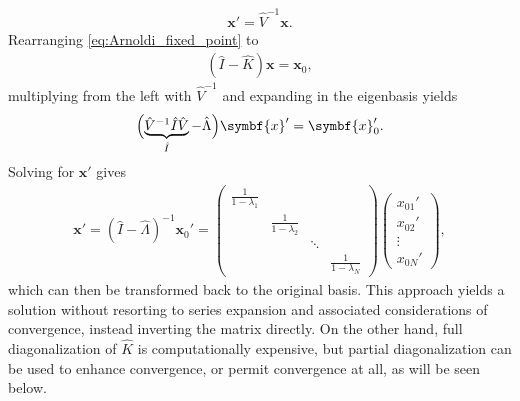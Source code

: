 \documentclass[a4paper, twoside, 10pt, english]{article}
\numberwithin{equation}{section}
\let\vec\symbf
\begin{document}
\begin{gather}
  \vec{x}' = \hat{V}^{-1} \vec{x}.
\end{gather}
Rearranging \cref{eq:Arnoldi_fixed_point} to
\begin{gather}
  \left ( \hat{I} - \hat{K} \right ) \vec{x} = \vec{x}_{0}, \label{eq:Arnoldi_direct}
\end{gather}
multiplying from the left with $\hat{V}^{-1}$ and expanding in the eigenbasis yields
\begin{gather}
  \Bigl ( \underbrace{\hat{V}^{-1} \hat{I} \hat{V}}_{\hat{I}} - \hat{\Lambda} \Bigr ) \vec{x}' = \vec{x}_{0}'.
\end{gather}
Solving for $\vec{x}'$ gives
\begin{gather}
  \vec{x}' = \left ( \hat{I} - \hat{\Lambda} \right )^{-1} \vec{x}_{0}' = \begin{pmatrix}
    \frac{1}{1 - \lambda_{1}} & & & \\
    & \frac{1}{1 - \lambda_{2}} & & \\
    & & \ddots & \\
    & & & \frac{1}{1 - \lambda_{N}}
  \end{pmatrix} \begin{pmatrix} x_{01}' \\ x_{02}' \\ \vdots \\ x_{0N}' \end{pmatrix}, \label{eq:direct_inversion}
\end{gather}
which can then be transformed back to the original basis. This approach yields a solution without resorting to series expansion and associated considerations of convergence, instead inverting the matrix directly. On the other hand, full diagonalization of $\hat{K}$ is computationally expensive, but partial diagonalization can be used to enhance convergence, or permit convergence at all, as will be seen below.
\end{document}
